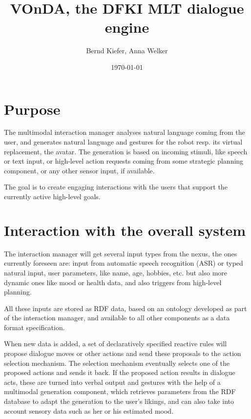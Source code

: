 \documentclass[a4paper]{memoir}
\newcommand{\vonda}{VOnDA\xspace}
\begin{document}
\title{\vonda, the DFKI MLT dialogue engine}
\author{Bernd Kiefer, Anna Welker}
\date{\today}

\maketitle

\tableofcontents

\chapter{Purpose}

The multimodal interaction manager analyses natural language coming from the
user, and generates natural language and gestures for the robot resp. its
virtual replacement, the avatar. The generation is based on incoming stimuli,
like speech or text input, or high-level action requests coming from some
strategic planning component, or any other sensor input, if available.

The goal is to create engaging interactions with the users that support the
currently active high-level goals.

\chapter{Interaction with the overall system}

The interaction manager will get several input types from the nexus, the ones
currently foreseen are: input from automatic speech recognition (ASR) or typed
natural input, user parameters, like name, age, hobbies, etc. but also more
dynamic ones like mood or health data, and also triggers from high-level
planning.

All these inputs are stored as RDF data, based on an ontology developed as part
of the interaction manager, and available to all other components as a data
format specification.

When new data is added, a set of declaratively specified reactive rules will
propose dialogue moves or other actions and send these proposals to the action
selection mechanism. The selection mechanism eventually selects one of the
proposed actions and sends it back. If the proposed action results in dialogue
acts, these are turned into verbal output and gestures with the help of a
multimodal generation component, which retrieves parameters from the RDF
database to adapt the generation to the user's likings, and can also take into
account sensory data such as her or his estimated mood.
\end{document}
